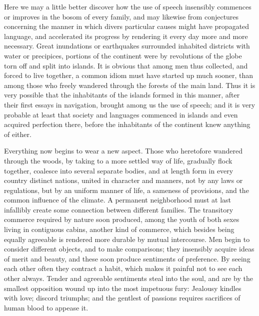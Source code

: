 \documentclass[11pt,twocolumn]{ltugboat}
\begin{document}
Here we may a little better discover how the use of speech insensibly
commences or improves in the bosom of every family, and may likewise
from conjectures concerning the manner in which divers particular
causes might have propagated language, and accelerated its progress by
rendering it every day more and more necessary. Great inundations or
earthquakes surrounded inhabited districts with water or precipices,
portions of the continent were by revolutions of the globe torn off
and split into islands. It is obvious that among men thus collected,
and forced to live together, a common idiom must have started up much
sooner, than among those who freely wandered through the forests of
the main land. Thus it is very possible that the inhabitants of the
islands formed in this manner, after their first essays in navigation,
brought among us the use of speech; and it is very probable at least
that society and languages commenced in islands and even acquired
perfection there, before the inhabitants of the continent knew
anything of either.

Everything now begins to wear a new aspect. Those who heretofore
wandered through the woods, by taking to a more settled way of life,
gradually flock together, coalesce into several separate bodies, and
at length form in every country distinct nations, united in character
and manners, not by any laws or regulations, but by an uniform manner
of life, a sameness of provisions, and the common influence of the
climate. A permanent neighborhood must at last infallibly create some
connection between different families. The transitory commerce
required by nature soon produced, among the youth of both sexes living
in contiguous cabins, another kind of commerce, which besides being
equally agreeable is rendered more durable by mutual intercourse. Men
begin to consider different objects, and to make comparisons; they
insensibly acquire ideas of merit and beauty, and these soon produce
sentiments of preference. By seeing each other often they contract a
habit, which makes it painful not to see each other always. Tender and
agreeable sentiments steal into the soul, and are by the smallest
opposition wound up into the most impetuous fury: Jealousy kindles
with love; discord triumphs; and the gentlest of passions requires
sacrifices of human blood to appease it.
\end{document}
